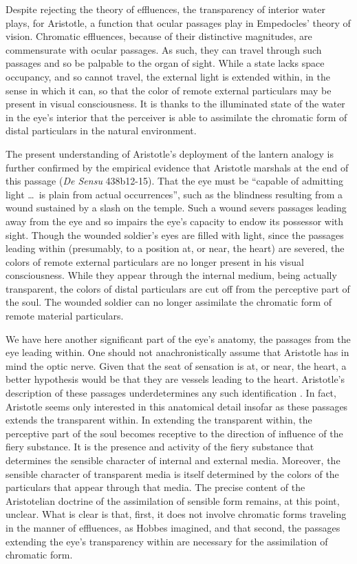 Despite rejecting the theory of effluences, the transparency of interior water plays, for Aristotle, a function that ocular passages play in Empedocles' theory of vision. Chromatic effluences, because of their distinctive magnitudes, are commensurate with ocular passages. As such, they can travel through such passages and so be palpable to the organ of sight. While a state lacks space occupancy, and so cannot travel, the external light is extended within, in the sense in which it can, so that the color of remote external particulars may be present in visual consciousness. It is thanks to the illuminated state of the water in the eye's interior that the perceiver is able to assimilate the chromatic form of distal particulars in the natural environment.

The present understanding of Aristotle's deployment of the lantern analogy is further confirmed by the empirical evidence that Aristotle marshals at the end of this passage (\emph{De Sensu} 438b12-15). That the eye must be ``capable of admitting light \ldots\ is plain from actual occurrences'', such as the blindness resulting from a wound sustained by a slash on the temple. Such a wound severs passages leading away from the eye and so impairs the eye's capacity to endow its possessor with sight. Though the wounded soldier's eyes are filled with light, since the passages leading within (presumably, to a position at, or near, the heart) are severed, the colors of remote external particulars are no longer present in his visual consciousness. While they appear through the internal medium, being actually transparent, the colors of distal particulars are cut off from the perceptive part of the soul. The wounded soldier can no longer assimilate the chromatic form of remote material particulars.

We have here another significant part of the eye's anatomy, the passages from the eye leading within. One should not anachronistically assume that Aristotle has in mind the optic nerve. Given that the seat of sensation is at, or near, the heart, a better hypothesis would be that they are vessels leading to the heart. Aristotle's description of these passages underdetermines any such identification \citep[see][]{Lloyd:1978fk}. In fact, Aristotle seems only interested in this anatomical detail insofar as these passages extends the transparent within. In extending the transparent within, the perceptive part of the soul becomes receptive to the direction of influence of the fiery substance. It is the presence and activity of the fiery substance that determines the sensible character of internal and external media. Moreover, the sensible character of transparent media is itself determined by the colors of the particulars that appear through that media. The precise content of the Aristotelian doctrine of the assimilation of sensible form remains, at this point, unclear. What is clear is that, first, it does not involve chromatic forms traveling in the manner of effluences, as Hobbes imagined, and that second, the passages extending the eye's transparency within are necessary for the assimilation of chromatic form. 

